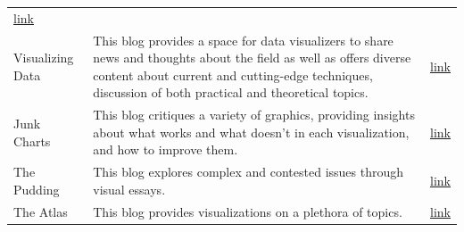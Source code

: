 \documentclass[]{book}
\begin{document}
\begin{longtable}[]{@{}lll@{}}
\begin{minipage}[t]{0.24\columnwidth}
\href{https://flowingdata.com/}{link}\strut
\end{minipage}\tabularnewline
\begin{minipage}[t]{0.24\columnwidth}\raggedright
Visualizing Data\strut
\end{minipage} & \begin{minipage}[t]{0.44\columnwidth}\raggedright
This blog provides a space for data visualizers to share news and thoughts about the field as well as offers diverse content about current and cutting-edge techniques, discussion of both practical and theoretical topics.\strut
\end{minipage} & \begin{minipage}[t]{0.24\columnwidth}\raggedright
\href{http://www.visualisingdata.com/}{link}\strut
\end{minipage}\tabularnewline
\begin{minipage}[t]{0.24\columnwidth}\raggedright
Junk Charts\strut
\end{minipage} & \begin{minipage}[t]{0.44\columnwidth}\raggedright
This blog critiques a variety of graphics, providing insights about what works and what doesn't in each visualization, and how to improve them.\strut
\end{minipage} & \begin{minipage}[t]{0.24\columnwidth}\raggedright
\href{http://junkcharts.typepad.com/}{link}\strut
\end{minipage}\tabularnewline
\begin{minipage}[t]{0.24\columnwidth}\raggedright
The Pudding\strut
\end{minipage} & \begin{minipage}[t]{0.44\columnwidth}\raggedright
This blog explores complex and contested issues through visual essays.\strut
\end{minipage} & \begin{minipage}[t]{0.24\columnwidth}\raggedright
\href{https://pudding.cool/}{link}\strut
\end{minipage}\tabularnewline
\begin{minipage}[t]{0.24\columnwidth}\raggedright
The Atlas\strut
\end{minipage} & \begin{minipage}[t]{0.44\columnwidth}\raggedright
This blog provides visualizations on a plethora of topics.\strut
\end{minipage} & \begin{minipage}[t]{0.24\columnwidth}\raggedright
\href{https://www.theatlas.com/}{link}\strut

\end{minipage}
\end{longtable}
\end{document}
